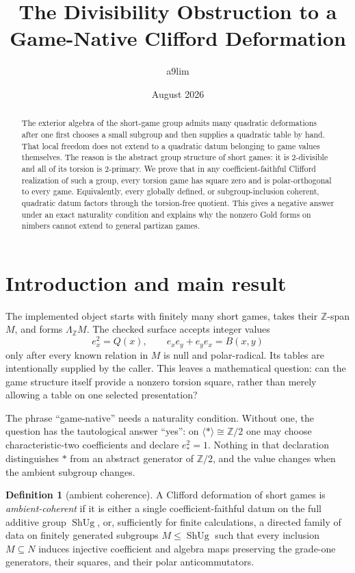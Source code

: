 \documentclass[11pt]{article}
\title{The Divisibility Obstruction to a Game-Native Clifford Deformation}
\author{a9lim}
\date{August 2026}
\theoremstyle{definition}
\newtheorem{definition}[theorem]{Definition}
\theoremstyle{remark}
\newcommand{\Z}{\mathbb Z}
\newcommand{\ShUg}{\operatorname{ShUg}}
\begin{document}
\maketitle

\begin{abstract}
The exterior algebra of the short-game group admits many quadratic
deformations after one first chooses a small subgroup and then supplies a
quadratic table by hand.  That local freedom does not extend to a quadratic
datum belonging to game values themselves.  The reason is the abstract group
structure of short games: it is $2$-divisible and all of its torsion is
$2$-primary.  We prove that in any coefficient-faithful Clifford realization
of such a group, every torsion game has square zero and is polar-orthogonal to
every game.  Equivalently, every globally defined, or subgroup-inclusion
coherent, quadratic datum factors through the torsion-free quotient.  This
gives a negative answer under an exact naturality condition and explains why
the nonzero Gold forms on nimbers cannot extend to
general partizan games.
\end{abstract}

\section{Introduction and main result}

The implemented object  starts with finitely many short
games, takes their $\Z$-span $M$, and forms $\Lambda_{\Z}M$.  The checked
 surface accepts integer values
\[
 e_x^2=Q(x),\qquad e_xe_y+e_ye_x=B(x,y)
\]
only after every known relation in $M$ is null and polar-radical.  Its tables
are intentionally supplied by the caller.  This leaves a mathematical
question: can the game structure itself provide a nonzero torsion square,
rather than merely allowing a table on one selected presentation?

The phrase ``game-native'' needs a naturality condition.  Without one, the
question has the tautological answer ``yes'': on $\langle *\rangle\cong\Z/2$
one may choose characteristic-two coefficients and declare $e_*^2=1$.
Nothing in that declaration distinguishes $*$ from an abstract generator of
$\Z/2$, and the value changes when the ambient subgroup changes.

\begin{definition}[ambient coherence]\label{def:coherent}
A Clifford deformation of short games is \emph{ambient-coherent} if it is
either a single coefficient-faithful datum on the full additive group
$\ShUg$, or, sufficiently for finite calculations, a directed family of data
on finitely generated subgroups $M\leq\ShUg$ such that every inclusion
$M\subseteq N$ induces injective coefficient and algebra maps preserving the
grade-one generators, their squares, and their polar anticommutators.
\end{definition}
\end{document}
